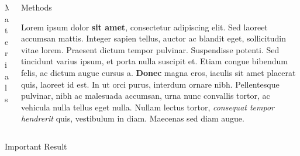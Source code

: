 \documentclass[final]{beamer}
\newlength{\onecolwid}
\newlength{\twocolwid}
\begin{document}
\begin{frame}[t]
\begin{columns}[t]
\begin{column}{\twocolwid}
\begin{columns}[t,totalwidth=\twocolwid]
\begin{column}{\onecolwid}
\begin{block}{Materials}
					\end{block}
					
					
				\end{column} %
				
				\begin{column}{\onecolwid}\vspace{-.6in} %
					
					
					\begin{block}{Methods}
						
						Lorem ipsum dolor \textbf{sit amet}, consectetur adipiscing elit. Sed laoreet accumsan mattis. Integer sapien tellus, auctor ac blandit eget, sollicitudin vitae lorem. Praesent dictum tempor pulvinar. Suspendisse potenti. Sed tincidunt varius ipsum, et porta nulla suscipit et. Etiam congue bibendum felis, ac dictum augue cursus a. \textbf{Donec} magna eros, iaculis sit amet placerat quis, laoreet id est. In ut orci purus, interdum ornare nibh. Pellentesque pulvinar, nibh ac malesuada accumsan, urna nunc convallis tortor, ac vehicula nulla tellus eget nulla. Nullam lectus tortor, \textit{consequat tempor hendrerit} quis, vestibulum in diam. Maecenas sed diam augue.
						
					\end{block}
					
					
				\end{column} %
				
			\end{columns} %
			
			
			\begin{alertblock}{Important Result}
				

\end{alertblock}
\end{column}
\end{columns}
\end{frame}
\end{document}
